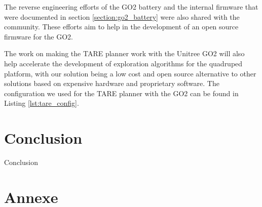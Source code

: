 \documentclass[12pt]{article}
\begin{document}
    The reverse engineering efforts of the GO2 battery and the internal firmware that were documented in section \ref{section:go2_battery} were also shared with the community. These efforts aim to help in the development of an open source firmware for the GO2.

    The work on making the TARE planner work with the Unitree GO2 will also help accelerate the development of exploration algorithms for the quadruped platform, with our solution being a low cost and open source alternative to other solutions based on expensive hardware and proprietary software. The configuration we used for the TARE planner with the GO2 can be found in Listing \ref{lst:tare_config}.



\newpage
\section{Conclusion}

    Conclusion     

\newpage

\newpage
{}
\printnoidxglossaries %

\newpage
{}
\listoffigures


\newpage
\section*{Annexe}




    
\end{document}
